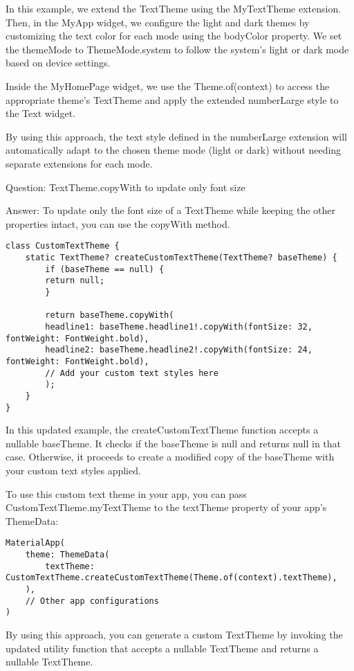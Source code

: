 In this example, we extend the TextTheme using the MyTextTheme extension. Then, in the MyApp widget, we configure the 
light and dark themes by customizing the text color for each mode using the bodyColor property. We set the themeMode 
to ThemeMode.system to follow the system's light or dark mode based on device settings.

Inside the MyHomePage widget, we use the Theme.of(context) to access the appropriate theme's TextTheme and apply 
the extended numberLarge style to the Text widget.

By using this approach, the text style defined in the numberLarge extension will automatically adapt to the chosen 
theme mode (light or dark) without needing separate extensions for each mode.


Question: TextTheme.copyWith to update only font size

Answer: To update only the font size of a TextTheme while keeping the other properties intact, you can use the 
copyWith method. 

\begin{lstlisting}
class CustomTextTheme {
    static TextTheme? createCustomTextTheme(TextTheme? baseTheme) {
        if (baseTheme == null) {
        return null;
        }
        
        return baseTheme.copyWith(
        headline1: baseTheme.headline1!.copyWith(fontSize: 32, fontWeight: FontWeight.bold),
        headline2: baseTheme.headline2!.copyWith(fontSize: 24, fontWeight: FontWeight.bold),
        // Add your custom text styles here
        );
    }
}     
\end{lstlisting}

In this updated example, the createCustomTextTheme function accepts a nullable baseTheme. It checks if the 
baseTheme is null and returns null in that case. Otherwise, it proceeds to create a modified copy of the 
baseTheme with your custom text styles applied.

To use this custom text theme in your app, you can pass CustomTextTheme.myTextTheme to the textTheme property of 
your app's ThemeData:

\begin{lstlisting}
MaterialApp(
    theme: ThemeData(
        textTheme: CustomTextTheme.createCustomTextTheme(Theme.of(context).textTheme),
    ),
    // Other app configurations
)   
\end{lstlisting}

By using this approach, you can generate a custom TextTheme by invoking the updated utility function that accepts a 
nullable TextTheme and returns a nullable TextTheme.



